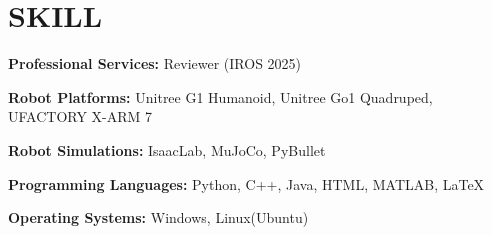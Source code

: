 \documentclass[a4paper,9pt]{extarticle}
\begin{document}
\section*{{\textbf{\fontsize{14pt}{8pt}\selectfont S}\textbf{\scshape KILL}}}
\textbf{Professional Services:} Reviewer (IROS 2025) 
\par\vspace{4pt}\noindent
\textbf{Robot Platforms:}{ Unitree
G1 Humanoid, Unitree Go1 Quadruped, UFACTORY X-ARM 7}
\par\vspace{4pt}\noindent
\textbf{Robot Simulations:}{ IsaacLab, MuJoCo, PyBullet}
\par\vspace{4pt}\noindent
\textbf{Programming Languages:}{ Python, C++, Java, HTML, MATLAB, \LaTeX}
\par\vspace{4pt}\noindent
\textbf{Operating Systems:}{ Windows, Linux(Ubuntu)}
\end{document}
